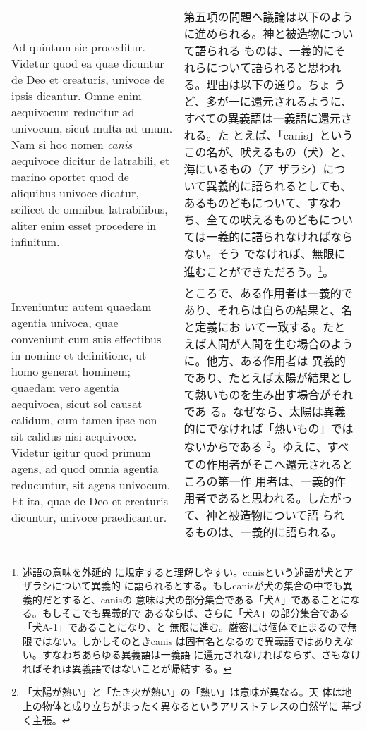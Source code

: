 \documentclass[10pt]{jsarticle}
\begin{document}
\begin{longtable}{p{21em}p{21em}}

{\sc Ad quintum sic proceditur}. Videtur quod ea quae dicuntur de Deo
et creaturis, univoce de ipsis dicantur. Omne enim aequivocum
reducitur ad univocum, sicut multa ad unum. Nam si hoc nomen {\it
canis} aequivoce dicitur de latrabili,
et marino
oportet quod de aliquibus univoce dicatur, scilicet de omnibus
latrabilibus, aliter enim esset procedere in infinitum.

&

第五項の問題へ議論は以下のように進められる。神と被造物について語られる
ものは、一義的にそれらについて語られると思われる。理由は以下の通り。ちょ
うど、多が一に還元されるように、すべての異義語は一義語に還元される。た
とえば、「canis」というこの名が、吠えるもの（犬）と、海にいるもの（ア
ザラシ）について異義的に語られるとしても、あるものどもについて、すなわ
ち、全ての吠えるものどもについては一義的に語られなければならない。そう
でなければ、無限に進むことができただろう。\footnote{述語の意味を外延的
に規定すると理解しやすい。canisという述語が犬とアザラシについて異義的
に語られるとする。もしcanisが犬の集合の中でも異義的だとすると、canisの
意味は犬の部分集合である「犬A」であることになる。もしそこでも異義的で
あるならば、さらに「犬A」の部分集合である「犬A-1」であることになり、と
無限に進む。厳密には個体で止まるので無限ではない。しかしそのときcanis
は固有名となるので異義語ではありえない。すなわちあらゆる異義語は一義語
に還元されなければならず、さもなければそれは異義語ではないことが帰結す
る。}。

\\

Inveniuntur autem quaedam agentia univoca, quae conveniunt cum suis
effectibus in nomine et definitione, ut homo generat hominem; quaedam
vero agentia aequivoca, sicut sol causat calidum, cum tamen ipse non
sit calidus nisi aequivoce. Videtur igitur quod primum agens, ad quod
omnia agentia reducuntur, sit agens univocum. Et ita, quae de Deo et
creaturis dicuntur, univoce praedicantur.

&

ところで、ある作用者は一義的であり、それらは自らの結果と、名と定義にお
いて一致する。たとえば人間が人間を生む場合のように。他方、ある作用者は
異義的であり、たとえば太陽が結果として熱いものを生み出す場合がそれであ
る。なぜなら、太陽は異義的にでなければ「熱いもの」ではないからである
\footnote{「太陽が熱い」と「たき火が熱い」の「熱い」は意味が異なる。天
体は地上の物体と成り立ちがまったく異なるというアリストテレスの自然学に
基づく主張。}。ゆえに、すべての作用者がそこへ還元されるところの第一作
用者は、一義的作用者であると思われる。したがって、神と被造物について語
られるものは、一義的に語られる。


\end{longtable}
\end{document}
